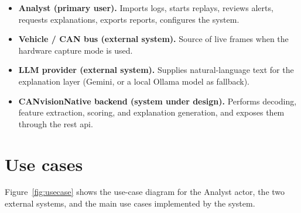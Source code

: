 \begin{itemize}
    \item \textbf{Analyst (primary user).} Imports logs, starts replays, reviews alerts, requests explanations, exports reports, configures the system.
    \item \textbf{Vehicle / CAN bus (external system).} Source of live frames when the hardware capture mode is used.
    \item \textbf{LLM provider (external system).} Supplies natural-language text for the explanation layer (Gemini, or a local Ollama model as fallback).
    \item \textbf{CANvisionNative backend (system under design).} Performs decoding, feature extraction, scoring, and explanation generation, and exposes them through the \gls{rest} \gls{api}.
\end{itemize}

\section{Use cases}

Figure~\ref{fig:usecase} shows the use-case diagram for the Analyst actor, the two external systems, and the main use cases implemented by the system.

